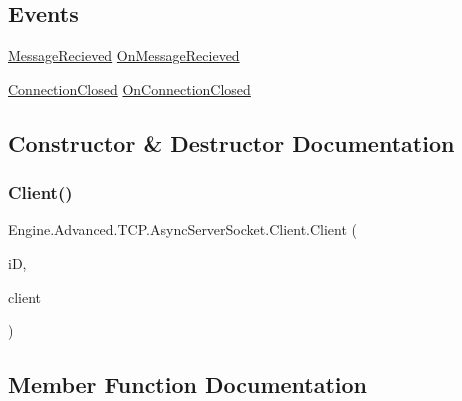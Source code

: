 \subsection*{Events}
\begin{DoxyCompactItemize}
\item 
\mbox{\hyperlink{class_engine_1_1_advanced_1_1_t_c_p_1_1_async_server_socket_1_1_client_aec5803c220dbc6dbe3cabc218dcfde50}{Message\+Recieved}} \mbox{\hyperlink{class_engine_1_1_advanced_1_1_t_c_p_1_1_async_server_socket_1_1_client_ad271460b7d07d4b467a8a9ea3b89864e}{On\+Message\+Recieved}}
\item 
\mbox{\hyperlink{class_engine_1_1_advanced_1_1_t_c_p_1_1_async_server_socket_1_1_client_a773e682fb931f02885fd915baffa9600}{Connection\+Closed}} \mbox{\hyperlink{class_engine_1_1_advanced_1_1_t_c_p_1_1_async_server_socket_1_1_client_a0b74722567ccb974f3fa2dbef12f5854}{On\+Connection\+Closed}}
\end{DoxyCompactItemize}


\subsection{Constructor \& Destructor Documentation}
\mbox{\label{class_engine_1_1_advanced_1_1_t_c_p_1_1_async_server_socket_1_1_client_a47a904451e967f0eb64fb23caa8b4dc7}} 
\subsubsection{\texorpdfstring{Client()}{Client()}}
{\footnotesize\ttfamily Engine.\+Advanced.\+T\+C\+P.\+Async\+Server\+Socket.\+Client.\+Client (\begin{DoxyParamCaption}\item[{int}]{iD,  }\item[{Tcp\+Client}]{client }\end{DoxyParamCaption})}



\subsection{Member Function Documentation}
\mbox{\label{class_engine_1_1_advanced_1_1_t_c_p_1_1_async_server_socket_1_1_client_a773e682fb931f02885fd915baffa9600}} 
